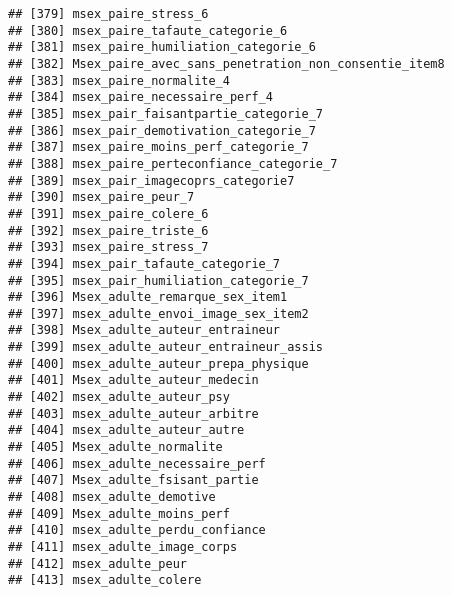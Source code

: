 \documentclass[
]{article}
\begin{document}
\begin{verbatim}
## [379] msex_paire_stress_6                                              
## [380] msex_paire_tafaute_categorie_6                                   
## [381] msex_paire_humiliation_categorie_6                               
## [382] Msex_paire_avec_sans_penetration_non_consentie_item8             
## [383] msex_paire_normalite_4                                           
## [384] msex_paire_necessaire_perf_4                                     
## [385] msex_pair_faisantpartie_categorie_7                              
## [386] msex_pair_demotivation_categorie_7                               
## [387] msex_paire_moins_perf_categorie_7                                
## [388] msex_paire_perteconfiance_categorie_7                            
## [389] msex_pair_imagecoprs_categorie7                                  
## [390] msex_paire_peur_7                                                
## [391] msex_paire_colere_6                                              
## [392] msex_paire_triste_6                                              
## [393] msex_paire_stress_7                                              
## [394] msex_pair_tafaute_categorie_7                                    
## [395] msex_pair_humiliation_categorie_7                                
## [396] Msex_adulte_remarque_sex_item1                                   
## [397] msex_adulte_envoi_image_sex_item2                                
## [398] Msex_adulte_auteur_entraineur                                    
## [399] msex_adulte_auteur_entraineur_assis                              
## [400] msex_adulte_auteur_prepa_physique                                
## [401] Msex_adulte_auteur_medecin                                       
## [402] msex_adulte_auteur_psy                                           
## [403] msex_adulte_auteur_arbitre                                       
## [404] msex_adulte_auteur_autre                                         
## [405] Msex_adulte_normalite                                            
## [406] msex_adulte_necessaire_perf                                      
## [407] Msex_adulte_fsisant_partie                                       
## [408] msex_adulte_demotive                                             
## [409] Msex_adulte_moins_perf                                           
## [410] msex_adulte_perdu_confiance                                      
## [411] msex_adulte_image_corps                                          
## [412] msex_adulte_peur                                                 
## [413] msex_adulte_colere                                               

\end{verbatim}
\end{document}
